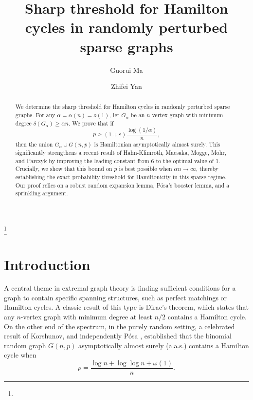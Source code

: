 \documentclass[11pt,reqno]{amsart}
\theoremstyle{definition}
\theoremstyle{remark}
\renewcommand\ge{\geqslant}
\begin{document}
\title{Sharp threshold for Hamilton cycles in randomly perturbed sparse graphs}
\author{
Guorui Ma
\and 
Zhifei Yan}

\address{Shanghai Institute for Mathematics and Interdisciplinary Sciences (SIMIS), Shanghai, 200433, China, Research institute of Intelligent Complex Systems, Fudan University, Shanghai, 200433, China}

\address{ECOPRO, Institute for Basic Science, 55 Expo-ro, Yuseong-gu, Daejeon, 34126, Korea}

\thanks{}

\begin{abstract}
We determine the sharp threshold for Hamilton cycles in randomly perturbed sparse graphs. For any $\alpha=\alpha(n)=o(1)$, let $G_{\alpha}$ be an $n$-vertex graph with minimum degree $\delta(G_{\alpha})\ge\alpha n$. We prove that if $$p\ge(1+\varepsilon)\frac{\log(1/\alpha)}{n},$$
then the union $G_{\alpha}\cup G(n,p)$ is Hamiltonian asymptotically almost surely. This significantly strengthens a recent result of Hahn-Klimroth, Maesaka, Mogge, Mohr, and Parczyk by improving the leading constant from 6 to the optimal value of 1. Crucially, we show that this bound on $p$ is best possible when $\alpha n\rightarrow\infty$, thereby establishing the exact probability threshold for Hamiltonicity in this sparse regime. Our proof relies on a robust random expansion lemma, P\'{o}sa's booster lemma, and a sprinkling argument.
\end{abstract}
	
\maketitle

\section{Introduction}

A central theme in extremal graph theory is finding sufficient conditions for a graph to contain specific spanning structures, such as perfect matchings or Hamilton cycles. A classic result of this type is Dirac's theorem, which states that any $n$-vertex graph with minimum degree at least $n/2$ contains a Hamilton cycle. On the other end of the spectrum, in the purely random setting, a celebrated result of Korshunov, and independently P\'osa \cite{posa}, established that the binomial random graph $G(n,p)$ asymptotically almost surely (a.a.s.) contains a Hamilton cycle when
$$p = \frac{\log n + \log \log n + \omega(1)}{n}.$$
\end{document}

